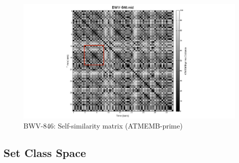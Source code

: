 \documentclass{article}
\begin{document}
\begin{figure}[htb]
\centering
\includegraphics[width=.8\linewidth]{./plots/ssm2.png}
\caption{\label{fig:ssm2}BWV-846: Self-similarity matrix (ATMEMB-prime)}
\end{figure}
\subsection{Set Class Space}
\label{sec-8-6}
\end{document}

